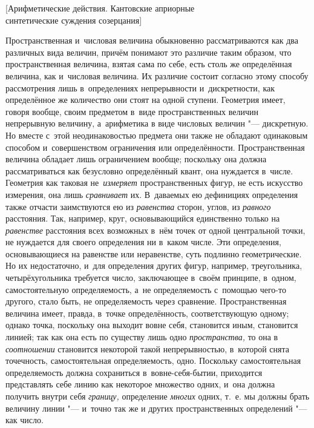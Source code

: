 %
{[Арифметические действия. Кантовские априорные\\
синтетические суждения созерцания]}

Пространственная и~числовая величина обыкновенно рассматриваются как два
различных вида величин, причём понимают это различие таким образом, что
пространственная величина, взятая сама по себе, есть столь же определённая
величина, как и~числовая величина. Их различие состоит согласно этому способу
рассмотрения лишь в~определениях непрерывности и~дискретности, как определённое
же количество они стоят на одной ступени. Геометрия имеет, говоря вообще, своим
предметом в~виде пространственных величин непрерывную величину, а~арифметика в
виде числовых величин "--- дискретную. Но вместе с~этой неодинаковостью
предмета они также не обладают одинаковым способом и~совершенством ограничения
или определённости. Пространственная величина обладает лишь ограничением
вообще; поскольку она должна рассматриваться как безусловно определённый
квант, она нуждается в~числе. Геометрия как таковая не~{\em измеряет}
пространственных фигур, не есть искусство измерения, она лишь {\em сравнивает}
их. В~даваемых ею дефинициях определения также отчасти заимствуются ею из
{\em равенства} сторон, углов, из {\em равного} расстояния. Так, например,
круг, основывающийся единственно только на {\em равенстве} расстояния всех
возможных в~нём точек от одной центральной точки, не нуждается для своего
определения ни в~каком числе. Эти определения, основывающиеся на равенстве или
неравенстве, суть подлинно геометрические. Но их недостаточно, и~для
определения других фигур, например, треугольника, четырёхугольника требуется
число, заключающее в~своём принципе, в~одном, самостоятельную определяемость,
а~не определяемость с~помощью чего-то другого, стало быть, не определяемость
через сравнение. Пространственная величина имеет, правда, в~точке
определённость, соответствующую одному; однако точка, поскольку она выходит вовне
себя, становится иным, становится линией; так как она есть по существу
лишь одно {\em пространства,} то она в {\em соотношении} становится некоторой
такой непрерывностью, в~которой снята точечность, самостоятельная
определяемость, одно. Поскольку самостоятельная определяемость должна
сохраниться в~вовне-себя-бытии, приходится представлять себе линию как некоторое
множество одних, и~она должна получить внутри себя {\em границу,} определение
{\em многих} одних, т.~е. мы должны брать величину линии "--- и~точно так же и
других пространственных определений "--- как число.

